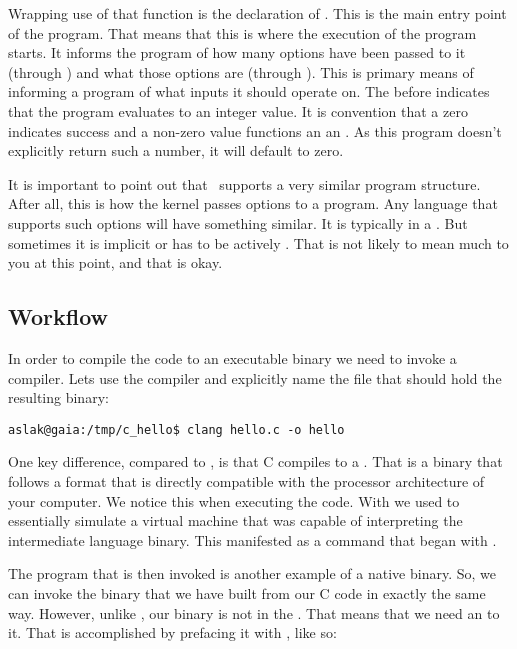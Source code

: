 Wrapping use of that  function is the declaration of . This is the main entry point of the program. That means that this is where the execution of the program starts. It informs the program of how many options have been passed to it (through ) and what those options are (through ). This is  primary means of informing a program of what inputs it should operate on. The  before  indicates that the program evaluates to an integer value. It is convention that a zero indicates success and a non-zero value functions an an . As this program doesn't explicitly return such a number, it will default to zero.

It is important to point out that \csharp\ supports a very similar program structure. After all, this is how the kernel passes options to a program. Any language that supports such options will have something similar. It is typically in a . But sometimes it is implicit or has to be actively . That is not likely to mean much to you at this point, and that is okay.

\subsection{Workflow}

In order to compile the code to an executable binary we need to invoke a compiler. Lets use the  compiler and explicitly name the file that should hold the resulting binary:

\begin{verbatim}
aslak@gaia:/tmp/c_hello$ clang hello.c -o hello
\end{verbatim}

One key difference, compared to \csharp, is that C compiles to a . That is a binary that follows a format that is directly compatible with the processor architecture of your computer. We notice this when executing the code. With \csharp we used  to essentially simulate a virtual machine that was capable of interpreting the intermediate language binary. This manifested as a command that began with .

The  program that is then invoked is another example of a native binary. So, we can invoke the binary that we have built from our C code in exactly the same way. However, unlike , our binary is not in the . That means that we need an  to it. That is accomplished by prefacing it with , like so:


